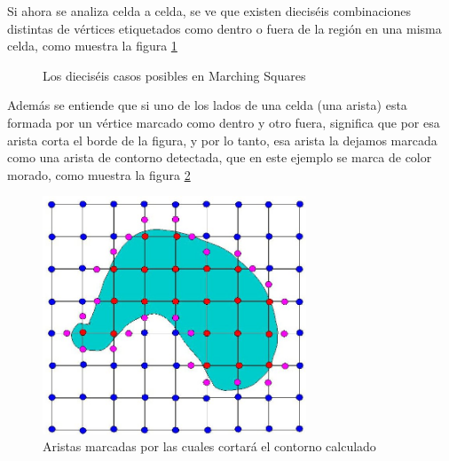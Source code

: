 Si ahora se analiza celda a celda, se ve que existen dieciséis combinaciones distintas de
vértices etiquetados como dentro o fuera de la región en una misma celda, como muestra la figura
\ref{f:estadoDelArte:cases}

\begin{figure}
\centering
\caption{Los dieciséis casos posibles en Marching Squares}
\label{f:estadoDelArte:cases}
\end{figure}

Además se entiende que si uno de los lados de una celda (una arista) esta formada por un
vértice marcado como dentro y otro fuera, significa que por esa arista corta el borde de la figura,
y por lo tanto, esa arista la dejamos marcada como una arista de contorno detectada, que en este
ejemplo se marca de color morado, como muestra la figura \ref{f:estadoDelArte:purpledobj}

\begin{figure}
\centering
	\includegraphics[width=0.7\textwidth]{images/marchingsquare/purpledobj.jpg}
\caption{Aristas marcadas por las cuales cortará el contorno calculado}
\label{f:estadoDelArte:purpledobj}
\end{figure}


